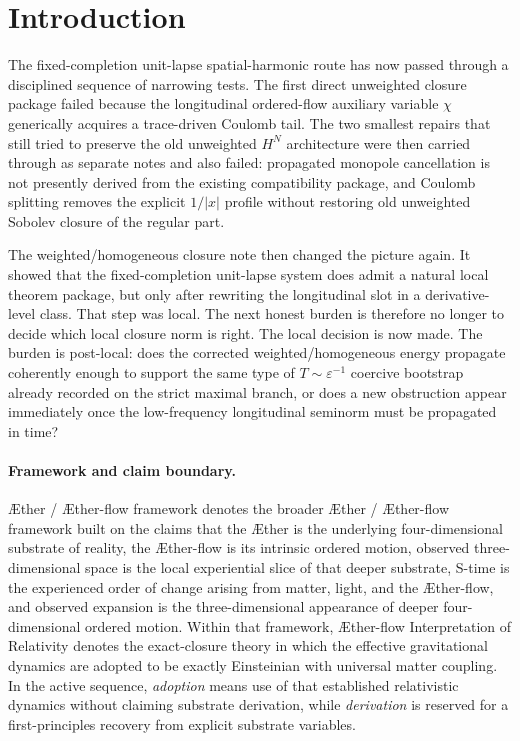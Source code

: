 \documentclass[11pt]{article}
\newcommand{\Aether}{\AE{}ther}
\newcommand{\Aflow}{\AE{}ther-flow}
\newcommand{\TheoryName}{\Aflow{} Interpretation of Relativity}
\newcommand{\TheoryProgram}{\Aether{} / \Aflow{} framework}
\begin{document}
\section{Introduction}

The fixed-completion unit-lapse spatial-harmonic route has now passed through a disciplined sequence of narrowing tests. The first direct unweighted closure package failed because the longitudinal ordered-flow auxiliary variable \(\chi\) generically acquires a trace-driven Coulomb tail. The two smallest repairs that still tried to preserve the old unweighted \(H^N\) architecture were then carried through as separate notes and also failed: propagated monopole cancellation is not presently derived from the existing compatibility package, and Coulomb splitting removes the explicit \(1/|x|\) profile without restoring old unweighted Sobolev closure of the regular part.

The weighted/homogeneous closure note then changed the picture again. It showed that the fixed-completion unit-lapse system does admit a natural local theorem package, but only after rewriting the longitudinal slot in a derivative-level class. That step was local. The next honest burden is therefore no longer to decide which local closure norm is right. The local decision is now made. The burden is post-local: does the corrected weighted/homogeneous energy propagate coherently enough to support the same type of \(T\sim \varepsilon^{-1}\) coercive bootstrap already recorded on the strict maximal branch, or does a new obstruction appear immediately once the low-frequency longitudinal seminorm must be propagated in time?

\paragraph{Framework and claim boundary.}
\TheoryProgram{} denotes the broader \Aether{} / \Aflow{} framework built on the claims that the \Aether{} is the underlying four-dimensional substrate of reality, the \Aflow{} is its intrinsic ordered motion, observed three-dimensional space is the local experiential slice of that deeper substrate, S-time is the experienced order of change arising from matter, light, and the \Aflow{}, and observed expansion is the three-dimensional appearance of deeper four-dimensional ordered motion. Within that framework, \TheoryName{} denotes the exact-closure theory in which the effective gravitational dynamics are adopted to be exactly Einsteinian with universal matter coupling. In the active sequence, \emph{adoption} means use of that established relativistic dynamics without claiming substrate derivation, while \emph{derivation} is reserved for a first-principles recovery from explicit substrate variables.
\end{document}
